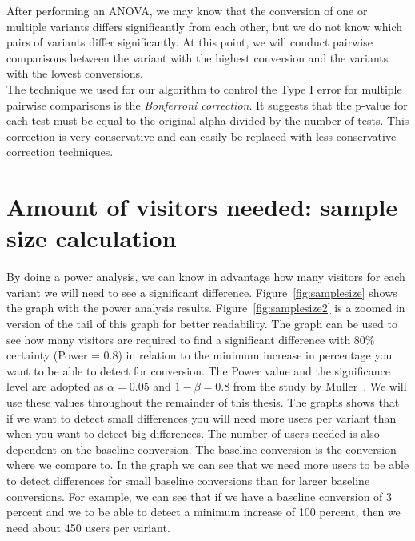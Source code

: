 \documentclass{report}
\begin{document}
After performing an ANOVA, we may know that the conversion of one or multiple variants differs significantly from each other, but we do not know which pairs of variants differ significantly. At this point, we will conduct pairwise comparisons between the variant with the highest conversion and the variants with the lowest conversions.\\

The technique we used for our algorithm to control the Type I error for multiple pairwise comparisons is the \textit{Bonferroni correction}. It suggests that the p-value for each test must be equal to the original alpha divided by the number of tests. This correction is very conservative and can easily be replaced with less conservative correction techniques.\\

\section{Amount of visitors needed: sample size calculation}
By doing a power analysis, we can know in advantage how many visitors for each variant we will need to see a significant difference. Figure~\ref{fig:samplesize} shows the graph with the power analysis results. Figure~\ref{fig:samplesize2} is a zoomed in version of the tail of this graph for better readability. The graph can be used to see how many visitors are required to find a significant difference with 80\% certainty (Power = 0.8) in relation to the minimum increase in percentage you want to be able to detect for conversion. The Power value and the significance level are adopted as $\alpha = 0.05$ and $1 - \beta = 0.8$ from the study by Muller~\cite{muller1989statistical}. We will use these values throughout the remainder of this thesis. The graphs shows that if we want to detect small differences you will need more users per variant than when you want to detect big differences. The number of users needed is also dependent on the baseline conversion. The baseline conversion is the conversion where we compare to. In the graph we can see that we need more users to be able to detect differences for small baseline conversions than for larger baseline conversions. For example, we can see that if we have a baseline conversion of 3 percent and we to be able to detect a minimum increase of 100 percent, then we need about 450 users per variant.\\
\end{document}
